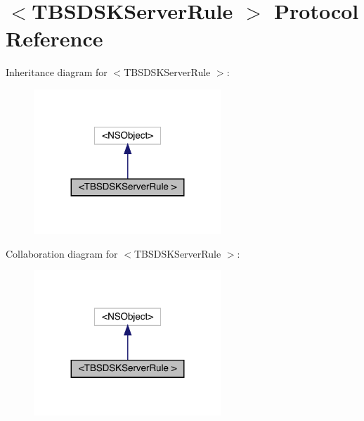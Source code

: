 \hypertarget{protocol_t_b_s_d_s_k_server_rule_01-p}{}\section{$<$T\+B\+S\+D\+S\+K\+Server\+Rule $>$ Protocol Reference}
\label{protocol_t_b_s_d_s_k_server_rule_01-p}


Inheritance diagram for $<$T\+B\+S\+D\+S\+K\+Server\+Rule $>$\+:\nopagebreak
\begin{figure}[H]
\begin{center}
\leavevmode
\includegraphics[width=200pt]{protocol_t_b_s_d_s_k_server_rule_01-p__inherit__graph}
\end{center}
\end{figure}


Collaboration diagram for $<$T\+B\+S\+D\+S\+K\+Server\+Rule $>$\+:\nopagebreak
\begin{figure}[H]
\begin{center}
\leavevmode
\includegraphics[width=200pt]{protocol_t_b_s_d_s_k_server_rule_01-p__coll__graph}
\end{center}
\end{figure}
